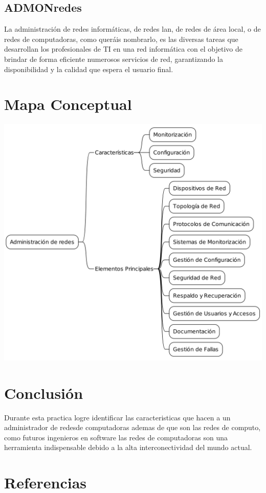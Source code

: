 \documentclass[11pt]{article}
\begin{document}
\subsection{ADMONredes}
\label{sec:orgd2d6722}
\autocite{ADMONredes_2023} La administración de redes informáticas, de redes lan, de redes de área local, o
de redes de computadoras, como queráis nombrarlo, es las diversas tareas que 
desarrollan los profesionales de TI en una red informática con el objetivo de 
brindar de forma eficiente numerosos servicios de red, garantizando la 
disponibilidad y la calidad que espera el usuario final.

\section{Mapa Conceptual}
\label{sec:org638c967}
\begin{center}
\includegraphics[width=.9\linewidth]{./images/mapa.png}
\end{center}

\pagebreak

\section{Conclusión}
\label{sec:org9131992}
Durante esta practica logre identificar las caracteristicas que hacen a un 
administrador de redesde computadoras ademas de que son las redes de computo, 
como futuros ingenieros en software las redes de computadoras son una herramienta
indispensable debido a la alta interconectividad del mundo actual.

\section{Referencias}
\label{sec:orgb7270c7}
\printbibliography[heading=none]
\end{document}
